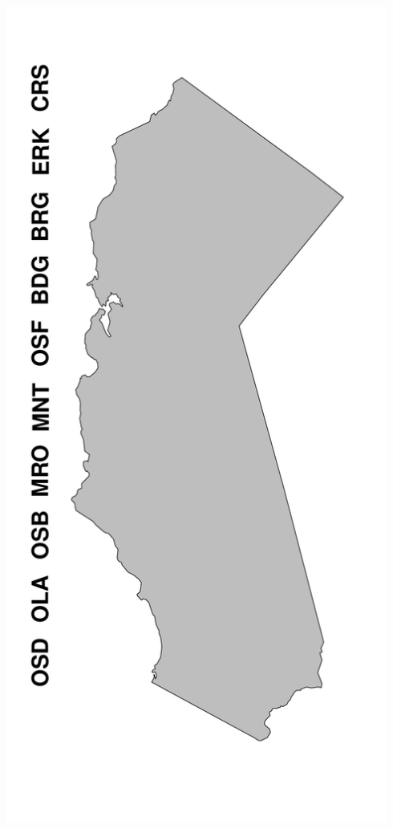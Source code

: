 \documentclass[a0paper,portrait]{baposter}
\begin{document}
\begin{poster}
{\begin{minipage}[h!]{0.19\textwidth}
	        \includegraphics[width=0.94\textwidth]{../pictures/mapFullBlank.pdf}
	\end{minipage}
	\begin{minipage}[h!]{0.19\textwidth}

\end{minipage}}
\end{poster}
\end{document}

